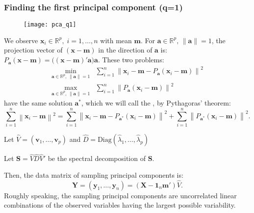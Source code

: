 \subsubsection{Finding the first principal component (q=1)}
\begin{figure}[H]
	\texttt{[image: pca\_q1]}
\end{figure}
We observe $\boldsymbol{x}_i \in \mathbb{R}^p,\;i=1,\ldots,n$ with mean $\boldsymbol{m}$.
For $\boldsymbol{a} \in \mathbb{R}^p,\, \lVert \boldsymbol a \rVert = 1$, the
projection vector of $(\boldsymbol{x} - \boldsymbol{m})$ in the direction of $\boldsymbol{a}$ is:
$P_{\boldsymbol{a}}(\boldsymbol{x} - \boldsymbol{m}) = \bigl( (\boldsymbol x - \boldsymbol m)' \boldsymbol a \bigr)
	\boldsymbol{a}$. These two problems:
\begin{align*}
	\min_{\boldsymbol{a} \in \mathbb{R}^p,\, \lVert \boldsymbol a \rVert = 1} & \sum_{i=1}^n
	\left\lVert \boldsymbol{x}_i - \boldsymbol{m} - P_{\boldsymbol{a}}(\boldsymbol{x}_i - \boldsymbol{m}) \right\rVert^2 \tag{Minimizing the orthogonal residuals} \\
	\max_{\boldsymbol{a} \in \mathbb{R}^p,\, \lVert \boldsymbol a \rVert = 1} & \sum_{i=1}^n
	\left\lVert P_{\boldsymbol{a}}(\boldsymbol{x}_i - \boldsymbol{m}) \right\rVert^2
	\tag{Maximizing the inertia of the projected data}
\end{align*}
have the same solution $\boldsymbol{a}^*$, which we will call the ,
by Pythagoras' theorem:
\begin{equation*}
	\sum_{i=1}^n \left\lVert \boldsymbol{x}_i - \boldsymbol{m} \right\rVert^2
	= \sum_{i=1}^n \left\lVert
	\boldsymbol{x}_i - \boldsymbol{m} - P_{\boldsymbol{a}^*}(\boldsymbol{x}_i - \boldsymbol{m})
	\right\rVert^2
	+ \sum_{i=1}^n \left\lVert P_{\boldsymbol{a}^*}(\boldsymbol{x}_i - \boldsymbol{m}) \right\rVert^2.
\end{equation*}

Let $\hat{V} = (\boldsymbol{v}_1,\ldots,\boldsymbol{v}_p)$ and $\hat{D} = \mathrm{Diag}(\hat{\lambda}_1,\ldots,\hat{\lambda}_p)$

Let $\boldsymbol S = \hat{V}\hat{D}\hat{V}'$ be the spectral decomposition of $\boldsymbol{S}$.

Then, the data matrix of sampling principal components is:
\begin{equation*}
	\boldsymbol{Y} = (\boldsymbol{y}_1,\ldots,\boldsymbol{y}_n) = (\boldsymbol{X} - \boldsymbol 1_n \boldsymbol m ')\hat{V}.
\end{equation*}
Roughly speaking, the sampling principal components are uncorrelated linear combinations of the
observed variables having the largest possible variability.

